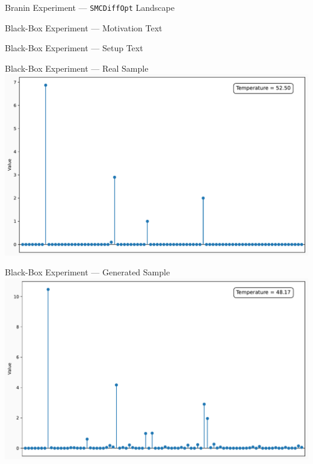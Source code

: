 \documentclass{beamer}
\begin{document}
    \begin{frame}{Branin Experiment --- \texttt{SMCDiffOpt} Landscape}
        \centering
    \end{frame}

    \begin{frame}{Black-Box Experiment --- Motivation}
        Text
    \end{frame}

    \begin{frame}{Black-Box Experiment --- Setup}
        Text
    \end{frame}

    \begin{frame}{Black-Box Experiment --- Real Sample}
        \centering
        \includegraphics[width=1\textwidth]{assets/bb-real-sample.pdf}
    \end{frame}

    \begin{frame}{Black-Box Experiment --- Generated Sample}
        \centering
        \includegraphics[width=1\textwidth]{assets/bb-unconditional-sample.pdf}
    \end{frame}
\end{document}
